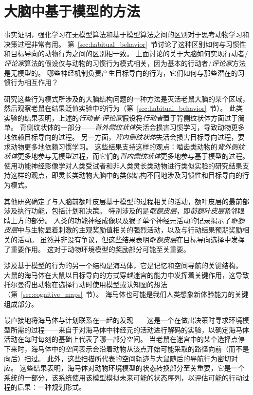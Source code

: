 \section{大脑中基于模型的方法}

事实证明，强化学习在无模型算法和基于模型算法之间的区别对于思考动物学习和决策过程非常有用。
第~\ref{sec:habitual_behavior}~节讨论了这种区别如何与习惯性和目标导向的动物行为之间的区别相一致。
上面讨论的关于大脑如何实现行动者/\textit{评论家}算法的假设仅与动物的习惯行为模式相关，因为基本的行动者/\textit{评论家}方法是无模型的。
哪些神经机制负责产生目标导向的行为，它们如何与那些潜在的习惯行为相互作用？


研究这些行为模式所涉及的大脑结构问题的一种方法是灭活老鼠大脑的某个区域，然后观察老鼠在结果贬值实验中的行为（第~\ref{sec:habitual_behavior}~节）。
此类实验的结果表明，上述的\textit{行动者-评论家}假设将\textit{行动者}置于背侧纹状体方面过于简单。
背侧纹状体的一部分——\textit{背外侧纹状体}失活会损害习惯学习，导致动物更多地依赖目标导向的过程。
另一方面，\textit{背内侧纹状体}失活会损害目标导向过程，要求动物更多地依赖习惯学习。
这些结果支持这样的观点：啮齿类动物的\textit{背外侧纹状体}更多地参与无模型过程，而它们的\textit{背内侧纹状体}更多地参与基于模型的过程。
使用功能神经影像学对人类受试者和非人类灵长类动物进行类似实验的研究结果支持这样的观点，即灵长类动物大脑中的类似结构不同地涉及习惯性和目标导向的行为模式。


其他研究确定了与人脑前额叶皮层基于模型的过程相关的活动，额叶皮层的最前部涉及执行功能，包括计划和决策。
特别涉及的是\textit{眶额皮层}，即\textit{前额叶皮层}紧邻眼睛上方的部分。
人类的功能神经成像以及猴子单个神经元活动的记录揭示了\textit{眶额皮层}中与生物显着刺激的主观奖励值相关的强烈活动，以及与行动结果预期奖励相关的活动。
虽然并非没有争议，但这些结果表明\textit{眶额皮层}在目标导向选择中发挥了重要作用。
这对于动物环境模型的奖励部分可能至关重要。


涉及基于模型的行为的另一个结构是海马体，它是记忆和空间导航的关键结构。
大鼠的海马体在大鼠以目标导向的方式穿越迷宫的能力中发挥着关键作用，这导致托尔曼得出动物在选择行动时使用模型或认知图的想法（第~\ref{sec:cognitive_maps}~节）。
海马体也可能是我们人类想象新体验能力的关键组成部分\cite{hassabis2007deconstructing,olafsdottir2015hippocampal}。


最直接地将海马体与计划联系在一起的发现——这是一个在做出决策时寻求环境模型所需的过程——来自于对海马体中神经元的活动进行解码的实验，以确定海马体活动在每时每刻的基础上代表了哪一部分空间。
当老鼠在迷宫中的某个选择点停下来时，海马体中的空间表示会沿着动物从该点开始可能采取的路径向前（而不是向后）扫过\cite{johnson2007neural}。
此外，这些扫描所代表的空间轨迹与大鼠随后的导航行为密切对应\cite{pfeiffer2013hippocampal}。
这些结果表明，海马体对动物环境模型的状态转换部分至关重要，它是一个系统的一部分，该系统使用该模型模拟未来可能的状态序列，以评估可能的行动过程的后果：一种规划形式。


